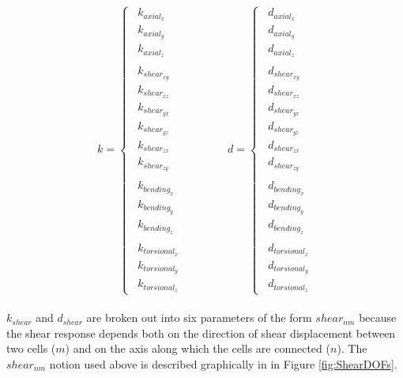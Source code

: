 {\[ k  = \begin{cases}
\enspace k_{axial_x}\\
\enspace k_{axial_y}\\
\enspace k_{axial_z}\\
\\
\enspace k_{shear_{xy}}\\
\enspace k_{shear_{xz}}\\
\enspace k_{shear_{yx}}\\
\enspace k_{shear_{yz}}\\
\enspace k_{shear_{zx}}\\
\enspace k_{shear_{zy}}\\
\\
\enspace k_{bending_x}\\
\enspace k_{bending_y}\\
\enspace k_{bending_z}\\
\\
\enspace k_{torsional_x}\\
\enspace k_{torsional_y}\\
\enspace k_{torsional_z}
 \end{cases}
 \qquad\qquad
 d  = \begin{cases}
\enspace d_{axial_x}\\
\enspace d_{axial_y}\\
\enspace d_{axial_z}\\
\\
\enspace d_{shear_{xy}}\\
\enspace d_{shear_{xz}}\\
\enspace d_{shear_{yx}}\\
\enspace d_{shear_{yz}}\\
\enspace d_{shear_{zx}}\\
\enspace d_{shear_{zy}}\\
\\
\enspace d_{bending_x}\\
\enspace d_{bending_y}\\
\enspace d_{bending_z}\\
\\
\enspace d_{torsional_x}\\
\enspace d_{torsional_y}\\
\enspace d_{torsional_z}
 \end{cases}  \]
\\

$k_{shear}$ and $d_{shear}$ are broken out into six parameters of the form $shear_{nm}$ because the shear response depends both on the direction of shear displacement between two cells ($m$) and on the axis along which the cells are connected ($n$).  The $shear_{nm}$ notion used above is described graphically in in Figure \ref{fig:ShearDOFs}.\\

}
